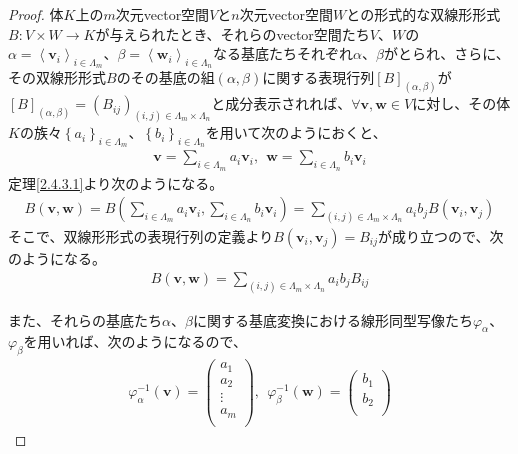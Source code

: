 \documentclass[dvipdfmx]{jsarticle}
\begin{document}
\begin{proof}
体$K$上の$m$次元vector空間$V$と$n$次元vector空間$W$との形式的な双線形形式$B:V \times W \rightarrow K$が与えられたとき、それらのvector空間たち$V$、$W$の$\alpha = \left\langle \mathbf{v}_{i} \right\rangle_{i \in \varLambda_{m}}$、$\beta = \left\langle \mathbf{w}_{i} \right\rangle_{i \in \varLambda_{n}}$なる基底たちそれぞれ$\alpha$、$\beta$がとられ、さらに、その双線形形式$B$のその基底の組$(\alpha,\beta)$に関する表現行列$[ B]_{(\alpha,\beta)}$が$[ B]_{(\alpha,\beta)} = \left( B_{ij} \right)_{(i,j) \in \varLambda_{m} \times \varLambda_{n}}$と成分表示されれば、$\forall\mathbf{v},\mathbf{w} \in V$に対し、その体$K$の族々$\left\{ a_{i} \right\}_{i \in \varLambda_{m}}$、$\left\{ b_{i} \right\}_{i \in \varLambda_{n}}$を用いて次のようにおくと、
\begin{align*}
\mathbf{v} = \sum_{i \in \varLambda_{m}} {a_{i}\mathbf{v}_{i}},\ \ \mathbf{w} = \sum_{i \in \varLambda_{n}} {b_{i}\mathbf{v}_{i}}
\end{align*}
定理\ref{2.4.3.1}より次のようになる。
\begin{align*}
B\left( \mathbf{v},\mathbf{w} \right) = B\left( \sum_{i \in \varLambda_{m}} {a_{i}\mathbf{v}_{i}},\sum_{i \in \varLambda_{n}} {b_{i}\mathbf{v}_{i}} \right) = \sum_{(i,j) \in \varLambda_{m} \times \varLambda_{n}} {a_{i}b_{j}B\left( \mathbf{v}_{i},\mathbf{v}_{j} \right)}
\end{align*}
そこで、双線形形式の表現行列の定義より$B\left( \mathbf{v}_{i},\mathbf{v}_{j} \right) = B_{ij}$が成り立つので、次のようになる。
\begin{align*}
B\left( \mathbf{v},\mathbf{w} \right) = \sum_{(i,j) \in \varLambda_{m} \times \varLambda_{n}} {a_{i}b_{j}B_{ij}}
\end{align*}\par
また、それらの基底たち$\alpha$、$\beta$に関する基底変換における線形同型写像たち$\varphi_{\alpha}$、$\varphi_{\beta}$を用いれば、次のようになるので、
\begin{align*}
\varphi_{\alpha}^{- 1}\left( \mathbf{v} \right) = \begin{pmatrix}
a_{1} \\
a_{2} \\
 \vdots \\
a_{m} \\
\end{pmatrix},\ \ \varphi_{\beta}^{- 1}\left( \mathbf{w} \right) = \begin{pmatrix}
b_{1} \\
b_{2} \\

\end{pmatrix}
\end{align*}
\end{proof}
\end{document}
